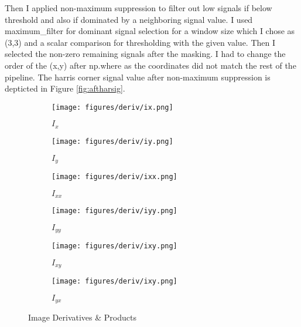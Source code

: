 \documentclass{article}
\begin{document}
\begin{center}
\begin{center}
        Then I applied non-maximum suppression to filter out low signals if below threshold and also if dominated by a neighboring signal value. I used maximum\_filter for dominant signal selection for a window size which I chose as (3,3) and a scalar comparison for thresholding with the given value. Then I selected the non-zero remaining signals after the masking. I had to change the order of the (x,y) after np.where as the coordinates did not match the rest of the pipeline. The harris corner signal value after non-maximum suppression is depticted in Figure \ref{fig:aftharsig}.
    \end{center}
    
    
\end{center}


\begin{figure}[H]
     \centering
     \begin{subfigure}[b]{0.3\textwidth}
         \centering
         \texttt{[image: figures/deriv/ix.png]}
         \caption{$I_{x}$}
         \label{fig:I_{x}}
     \end{subfigure}
     \hfill
     \begin{subfigure}[b]{0.3\textwidth}
         \centering
         \texttt{[image: figures/deriv/iy.png]}
         \caption{$I_{y}$}
         \label{fig:I_{y}}
     \end{subfigure}
     \hfill
     \begin{subfigure}[b]{0.3\textwidth}
         \centering
         \texttt{[image: figures/deriv/ixx.png]}
         \caption{$I_{xx}$}
         \label{fig:I_{xx}}
     \end{subfigure}
     \hfill
     \begin{subfigure}[b]{0.3\textwidth}
         \centering
         \texttt{[image: figures/deriv/iyy.png]}
         \caption{$I_{yy}$}
         \label{fig:I_{yy}}
     \end{subfigure}
     \hfill
     \begin{subfigure}[b]{0.3\textwidth}
         \centering
         \texttt{[image: figures/deriv/ixy.png]}
         \caption{$I_{xy}$}
         \label{fig:I_{xy}}
     \end{subfigure}
     \hfill
     \begin{subfigure}[b]{0.3\textwidth}
         \centering
         \texttt{[image: figures/deriv/ixy.png]}
         \caption{$I_{yx}$}
         \label{fig:I_{yx}}
     \end{subfigure}
     
        \caption{Image Derivatives \& Products}
        \label{fig:deriv}
\end{figure}
\end{document}
